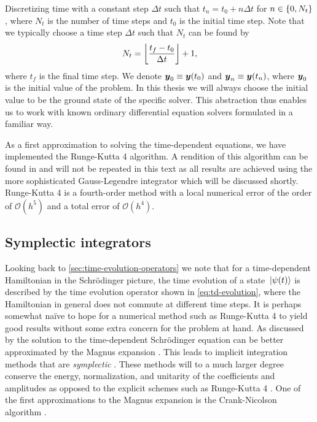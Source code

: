             Discretizing time with a constant step $\Delta t$ such that $t_n
            = t_0 + n \Delta t$ for $n \in \left\{ 0, N_t \right\}$, where $N_t$ is the number of
            time steps and $t_0$ is the initial time step.
            Note that we typically choose a time step $\Delta t$ such that $N_t$ can be
            found by
            \begin{align}
                N_t = \left\lfloor \frac{t_f - t_0}{\Delta t} \right\rfloor + 1,
            \end{align}
            where $t_f$ is the final time step.
            We denote $\boldsymbol{y}_0 \equiv \boldsymbol{y}(t_0)$ and $\boldsymbol{y}_n \equiv
            \boldsymbol{y}(t_n)$, where $\boldsymbol{y}_0$ is the initial value of the
            problem.
            In this thesis we will always choose the initial value to be the
            ground state of the specific solver.
            This abstraction thus enables us to work with known ordinary
            differential equation solvers formulated in a familiar way.

            As a first approximation to solving the time-dependent equations,
            we have implemented the Runge-Kutta 4 algorithm.
            A rendition of this algorithm can be found in
             \cite{morken2017notes} and will not be
            repeated in this text as all results are achieved using the more
            sophisticated Gauss-Legendre integrator which will be discussed
            shortly.
            Runge-Kutta 4 is a fourth-order method with a local numerical error
            of the order of $\mathcal{O}(h^5)$ and a total error of
            $\mathcal{O}(h^4)$.

        \subsection{Symplectic integrators}
            \label{subsec:symplectic}
            Looking back to \autoref{sec:time-evolution-operators} we note that
            for a time-dependent Hamiltonian in the Schrödinger picture, the
            time evolution of a state $\ket*{\psi(t)}$ is described by the
            time evolution operator shown in \autoref{eq:td-evolution}, where
            the Hamiltonian in general does not commute at different time steps.
            It is perhaps somewhat naïve to hope for a numerical method such as
            Runge-Kutta 4 to yield good results without some extra concern for
            the problem at hand.
            As discussed by \citeauthor{joshua-magnus} \cite{joshua-magnus} the
            solution to the time-dependent Schrödinger equation can be better
            approximated by the Magnus expansion \cite{magnus-expansion}.
            This leads to implicit integration methods that are
            \emph{symplectic} \cite{joshua-magnus}.
            These methods will to a much larger degree conserve the energy,
            normalization, and unitarity of the coefficients and amplitudes as
            opposed to the explicit schemes such as Runge-Kutta 4
            \cite{joshua-magnus, pedersen2018symplectic}.
            One of the first approximations to the Magnus expansion is the
            Crank-Nicolson algorithm \cite{ullrich2011time, joshua-magnus}.


